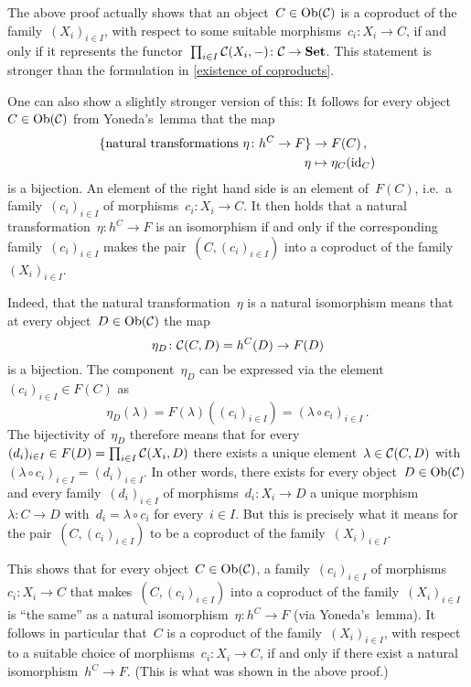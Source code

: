 \begin{remark*}
  The above proof actually shows that an object~$C \in \operatorname{Ob}(\mathcal{C})$ is a coproduct of the family~$(X_i)_{i \in I}$, with respect to some suitable morphisms~$c_i \colon X_i \to C$, if and only if it represents the functor~$\prod_{i \in I} \mathcal{C}(X_i, -) \colon \mathcal{C} \to \mathbf{Set}$.
  This statement is stronger than the formulation in \cref{existence of coproducts}.
  
  One can also show a slightly stronger version of this:
  It follows for every object~$C \in \operatorname{Ob}(\mathcal{C})$ from Yoneda’s~lemma that the map
  \begin{align*}
              \{ \text{natural transformations~$\eta \colon h^C \to F$} \}
    &\to      F(C) \,,
    \\
              \eta
    &\mapsto  \eta_C(\operatorname{id}_C)
  \end{align*}
  is a bijection.
  An element of the right hand side is an element of~$F(C)$, i.e.\ a family~$(c_i)_{i \in I}$ of morphisms~$c_i \colon X_i \to C$.
  It then holds that a natural transformation~$\eta \colon h^C \to F$ is an isomorphism if and only if the corresponding family~$(c_i)_{i \in I}$ makes the pair~$(C, (c_i)_{i \in I})$ into a coproduct of the family~$(X_i)_{i \in I}$.
  
  Indeed, that the natural transformation~$\eta$ is a natural isomorphism means that at every object~$D \in \operatorname{Ob}(\mathcal{C})$ the map
  \[
            \eta_D
    \colon  \mathcal{C}(C,D)
    =       h^C(D)
    \to     F(D)
  \]
  is a bijection.
  The component~$\eta_D$ can be expressed via the element~$(c_i)_{i \in I} \in F(C)$ as
  \[
      \eta_D(\lambda)
    = F(\lambda)( (c_i)_{i \in I} )
    = (\lambda \circ c_i)_{i \in I} \,.
  \]
  The bijectivity of~$\eta_D$ therefore means that for every~$(d_i)_{i \in I} \in F(D) = \prod_{i \in I} \mathcal{C}(X_i, D)$ there exists a unique element~$\lambda \in \mathcal{C}(C, D)$ with~$(\lambda \circ c_i)_{i \in I} = (d_i)_{i \in I}$.
  In other words, there exists for every object~$D \in \operatorname{Ob}(\mathcal{C})$ and every family~$(d_i)_{i \in I}$ of morphisms~$d_i \colon X_i \to D$ a unique morphism~$\lambda \colon C \to D$ with~$d_i = \lambda \circ c_i$ for every~$i \in I$.
  But this is precisely what it means for the pair~$(C, (c_i)_{i \in I})$ to be a coproduct of the family~$(X_i)_{i \in I}$.
  
  This shows that for every object~$C \in \operatorname{Ob}(\mathcal{C})$, a family~$(c_i)_{i \in I}$ of morphisms~$c_i \colon X_i \to C$ that makes~$(C, (c_i)_{i \in I})$ into a coproduct of the family~$(X_i)_{i \in I}$ is \enquote{the same} as a natural isomorphism~$\eta \colon h^C \to F$ (via Yoneda’s~lemma).
  It follows in particular that~$C$ is a coproduct of the family~$(X_i)_{i \in I}$, with respect to a suitable choice of morphisms~$c_i \colon X_i \to C$, if and only if there exist a natural isomorphism~$h^C \to F$.
  (This is what was shown in the above proof.)
\end{remark*}


